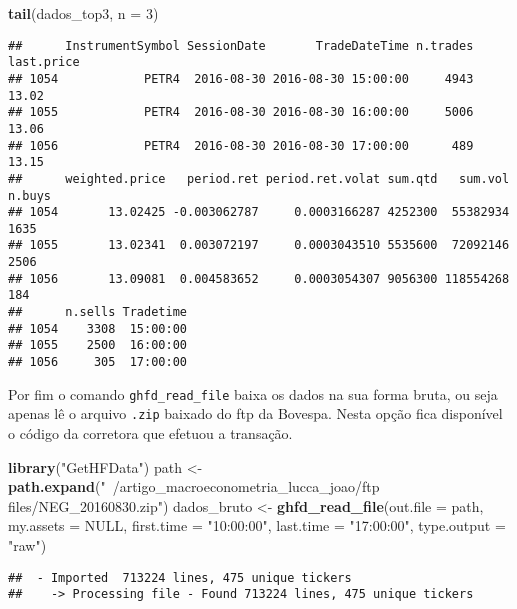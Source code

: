\documentclass[]{article}
\newenvironment{Shaded}{\begin{snugshade}}{\end{snugshade}}
\newcommand{\KeywordTok}[1]{\textcolor[rgb]{0.13,0.29,0.53}{\textbf{{#1}}}}
\newcommand{\DataTypeTok}[1]{\textcolor[rgb]{0.13,0.29,0.53}{{#1}}}
\newcommand{\DecValTok}[1]{\textcolor[rgb]{0.00,0.00,0.81}{{#1}}}
\newcommand{\StringTok}[1]{\textcolor[rgb]{0.31,0.60,0.02}{{#1}}}
\newcommand{\OtherTok}[1]{\textcolor[rgb]{0.56,0.35,0.01}{{#1}}}
\newcommand{\NormalTok}[1]{{#1}}
\begin{document}
\begin{Shaded}
\begin{Highlighting}[]
\KeywordTok{tail}\NormalTok{(dados_top3, }\DataTypeTok{n =} \DecValTok{3}\NormalTok{)}
\end{Highlighting}
\end{Shaded}

\begin{verbatim}
##      InstrumentSymbol SessionDate       TradeDateTime n.trades last.price
## 1054            PETR4  2016-08-30 2016-08-30 15:00:00     4943      13.02
## 1055            PETR4  2016-08-30 2016-08-30 16:00:00     5006      13.06
## 1056            PETR4  2016-08-30 2016-08-30 17:00:00      489      13.15
##      weighted.price   period.ret period.ret.volat sum.qtd   sum.vol n.buys
## 1054       13.02425 -0.003062787     0.0003166287 4252300  55382934   1635
## 1055       13.02341  0.003072197     0.0003043510 5535600  72092146   2506
## 1056       13.09081  0.004583652     0.0003054307 9056300 118554268    184
##      n.sells Tradetime
## 1054    3308  15:00:00
## 1055    2500  16:00:00
## 1056     305  17:00:00
\end{verbatim}

Por fim o comando \texttt{ghfd\_read\_file} baixa os dados na sua forma
bruta, ou seja apenas lê o arquivo \texttt{.zip} baixado do ftp da
Bovespa. Nesta opção fica disponível o código da corretora que efetuou a
transação.

\begin{Shaded}
\begin{Highlighting}[]
\KeywordTok{library}\NormalTok{(}\StringTok{"GetHFData"}\NormalTok{)}
\NormalTok{path <-}\StringTok{ }\KeywordTok{path.expand}\NormalTok{(}\StringTok{"~/artigo_macroeconometria_lucca_joao/ftp files/NEG_20160830.zip"}\NormalTok{)}
\NormalTok{dados_bruto <-}\StringTok{ }\KeywordTok{ghfd_read_file}\NormalTok{(}\DataTypeTok{out.file =} \NormalTok{path, }\DataTypeTok{my.assets =} \OtherTok{NULL}\NormalTok{, }\DataTypeTok{first.time =} \StringTok{"10:00:00"}\NormalTok{, }
    \DataTypeTok{last.time =} \StringTok{"17:00:00"}\NormalTok{, }\DataTypeTok{type.output =} \StringTok{"raw"}\NormalTok{)}
\end{Highlighting}
\end{Shaded}

\begin{verbatim}
##  - Imported  713224 lines, 475 unique tickers
##    -> Processing file - Found 713224 lines, 475 unique tickers
\end{verbatim}
\end{document}
